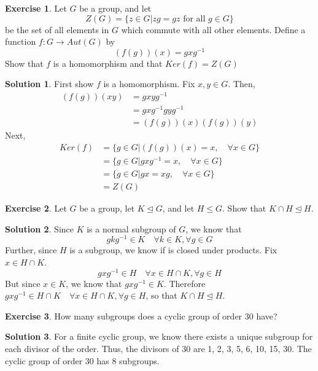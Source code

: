 \documentclass[12pt]{article}
\theoremstyle{definition}
\newtheorem{exercise}{\color{YellowOrange}Exercise}
\theoremstyle{definition}
\newtheorem{solution}{\color{Goldenrod}Solution}
\begin{document}
\begin{exercise}
Let $G$ be a group, and let
\begin{equation}
	Z(G) = \{ z \in G | zg = gz \text{ for all } g \in G\}
\end{equation}
be the set of all elements in $G$ which commute with all other elements. Define a function $f: G\to Aut(G)$ by 
\begin{equation}
	(f(g))(x) = gxg^{-1}
\end{equation}
Show that $f$ is a homomorphism and that $Ker(f) = Z(G)$
\end{exercise}
\begin{solution}
First show $f$ is a homomorphism. Fix $x,y \in G$. Then,
\begin{align*}
	(f(g))(xy) &= gxyg^{-1} \\
	&=gxg^{-1}gyg^{-1} \\
	&=(f(g))(x)(f(g))(y)
\end{align*}
Next, 
\begin{align*}
	Ker(f) &= \{g \in G | (f(g))(x) = x, \quad \forall x \in G \} \\
	&= \{g \in G |  gxg^{-1} = x, \quad \forall x \in G \} \\
	&= \{g \in G |  gx = xg, \quad \forall x \in G \} \\
	&= Z(G)
\end{align*}
\end{solution}

\begin{exercise}
Let $G$ be a group, let $K \trianglelefteq G$, and let $H \leq G$. Show that $K \cap H \trianglelefteq H$.
\end{exercise}
\begin{solution}
Since $K$ is a normal subgroup of $G$, we know that
\begin{equation}
	gkg^{-1} \in K \quad \forall k \in K, \forall g \in G
\end{equation}
Further, since $H$ is a subgroup, we know if is closed under products. Fix $x \in H \cap K$. 
\begin{equation}
	gxg^{-1} \in H \quad \forall x \in H \cap K, \forall g \in H
\end{equation}
But since $x \in K$, we know that $gxg^{-1} \in K$. Therefore $gxg^{-1} \in H \cap K \quad \forall x \in H \cap K, \forall g \in H$, so that $K \cap H \trianglelefteq H$.
\end{solution}

\begin{exercise}
How many subgroups does a cyclic group of order 30 have?
\end{exercise}
\begin{solution}
For a finite cyclic group, we know there exists a unique subgroup for each divisor of the order. Thus, the divisors of 30 are 1, 2, 3, 5, 6, 10, 15, 30. The cyclic group of order 30 has 8 subgroups. 
\end{solution}
\end{document}
